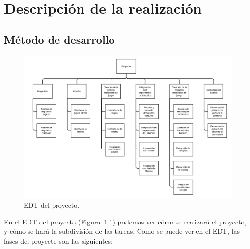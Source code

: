 \chapter{Descripción de la realización}

\section{Método de desarrollo}

\begin{figure}
	\centering
	\includegraphics[height=\textwidth, angle=-90]{fig/edt}
	\caption{EDT del proyecto.}\label{fig:edt}
\end{figure}

En el EDT del proyecto (Figura~\ref{fig:edt}) podemos ver cómo se realizará el proyecto, y cómo se
hará la subdivisión de las tareas. Como se puede ver en el EDT, las fases del proyecto son las
siguientes:

